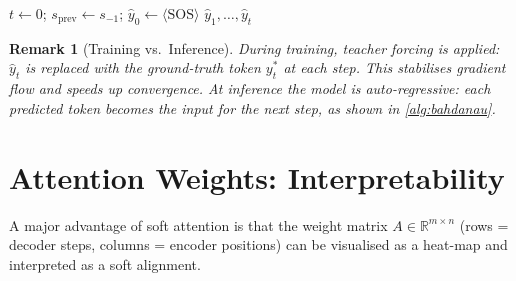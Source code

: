 \documentclass[12pt,a4paper]{article}
\newtheorem{remark}{Remark}[section]
\begin{document}
\begin{algorithm}[ht]
\caption{Bahdanau Attention Decoding (Inference)}
\label{alg:bahdanau}
\DontPrintSemicolon
{}
\BlankLine
$t \leftarrow 0$; \quad $s_{\mathrm{prev}} \leftarrow s_{-1}$; \quad
$\hat{y}_0 \leftarrow \langle\mathrm{SOS}\rangle$ \;
\Return $\hat{y}_1, \ldots, \hat{y}_t$
\end{algorithm}

\begin{remark}[Training vs.\ Inference]
\label{rem:training}
During \emph{training}, teacher forcing is applied: $\hat{y}_t$ is
replaced with the ground-truth token $y_t^*$ at each step.  This
stabilises gradient flow and speeds up convergence.  At
\emph{inference} the model is auto-regressive: each predicted token
becomes the input for the next step, as shown in
\cref{alg:bahdanau}.
\end{remark}

\section{Attention Weights: Interpretability}
\label{sec:interpret}

A major advantage of soft attention is that the weight matrix
$A \in \mathbb{R}^{m \times n}$ (rows = decoder steps, columns =
encoder positions) can be visualised as a heat-map and interpreted as
a soft alignment.
\end{document}
